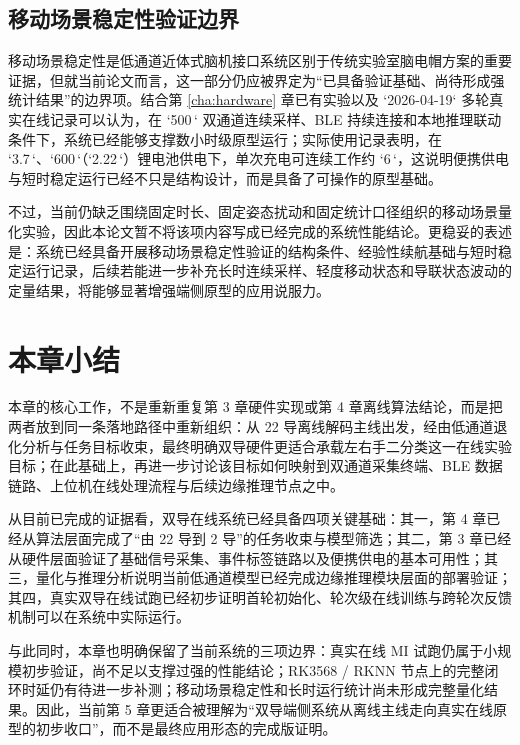 \subsection{移动场景稳定性验证边界}

移动场景稳定性是低通道近体式脑机接口系统区别于传统实验室脑电帽方案的重要证据，但就当前论文而言，这一部分仍应被界定为“已具备验证基础、尚待形成强统计结果”的边界项。结合第 \ref{cha:hardware} 章已有实验以及 `2026-04-19` 多轮真实在线记录可以认为，在 `500\,` 双通道连续采样、BLE 持续连接和本地推理联动条件下，系统已经能够支撑数小时级原型运行；实际使用记录表明，在 `3.7\,`、`600\,`（`2.22\,`）锂电池供电下，单次充电可连续工作约 `6\,`，这说明便携供电与短时稳定运行已经不只是结构设计，而是具备了可操作的原型基础。

不过，当前仍缺乏围绕固定时长、固定姿态扰动和固定统计口径组织的移动场景量化实验，因此本论文暂不将该项内容写成已经完成的系统性能结论。更稳妥的表述是：系统已经具备开展移动场景稳定性验证的结构条件、经验性续航基础与短时稳定运行记录，后续若能进一步补充长时连续采样、轻度移动状态和导联状态波动的定量结果，将能够显著增强端侧原型的应用说服力。

\section{本章小结}

本章的核心工作，不是重新重复第 3 章硬件实现或第 4 章离线算法结论，而是把两者放到同一条落地路径中重新组织：从 22 导离线解码主线出发，经由低通道退化分析与任务目标收束，最终明确双导硬件更适合承载左右手二分类这一在线实验目标；在此基础上，再进一步讨论该目标如何映射到双通道采集终端、BLE 数据链路、上位机在线处理流程与后续边缘推理节点之中。

从目前已完成的证据看，双导在线系统已经具备四项关键基础：其一，第 4 章已经从算法层面完成了“由 22 导到 2 导”的任务收束与模型筛选；其二，第 3 章已经从硬件层面验证了基础信号采集、事件标签链路以及便携供电的基本可用性；其三，量化与推理分析说明当前低通道模型已经完成边缘推理模块层面的部署验证；其四，真实双导在线试跑已经初步证明首轮初始化、轮次级在线训练与跨轮次反馈机制可以在系统中实际运行。

与此同时，本章也明确保留了当前系统的三项边界：真实在线 MI 试跑仍属于小规模初步验证，尚不足以支撑过强的性能结论；RK3568 / RKNN 节点上的完整闭环时延仍有待进一步补测；移动场景稳定性和长时运行统计尚未形成完整量化结果。因此，当前第 5 章更适合被理解为“双导端侧系统从离线主线走向真实在线原型的初步收口”，而不是最终应用形态的完成版证明。

